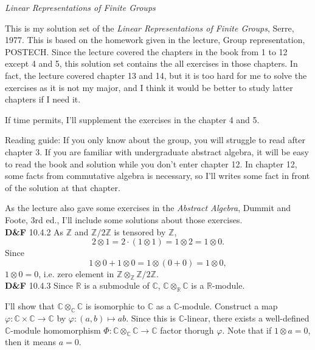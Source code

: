 \documentclass[a4paper, 12pt]{article}
\theoremstyle{Mydefinition}
\theoremstyle{Mytheorem}
\begin{document}
\thispagestyle{myfirstpage}
\begin{center}
	\Large{\textit{Linear Representations of Finite Groups}}
\end{center}

This is my solution set of the \textit{Linear Representations of Finite Groups}, Serre, 1977. This is based on the homework given in the lecture, Group representation, POSTECH. Since the lecture covered the chapters in the book from 1 to 12 except 4 and 5, this solution set contains the all exercises in those chapters. In fact, the lecture covered chapter 13 and 14, but it is too hard for me to solve the exercises as it is not my major, and I think it would be better to study latter chapters if I need it.

If time permits, I'll supplement the exercises in the chapter 4 and 5.

Reading guide: If you only know about the group, you will struggle to read after chapter 3. If you are familiar with undergraduate abstract algebra, it will be easy to read the book and solution while you don't enter chapter 12. In chapter 12, some facts from commutative algebra is necessary, so I'll writes some fact in front of the solution at that chapter.

As the lecture also gave some exercises in the \textit{Abstract Algebra}, Dummit and Foote, 3rd ed., I'll include some solutions about those exercises.\\

\noindent \textbf{D\&F} 10.4.2
As $\mathbb{Z}$ and $\mathbb{Z}/2\mathbb{Z}$ is tensored by $\mathbb{Z}$,
\begin{equation}
    2\otimes 1 = 2\cdot (1\otimes 1) = 1 \otimes 2 = 1 \otimes 0.
\end{equation}
Since
\begin{equation}
    1 \otimes 0 + 1 \otimes 0 = 1\otimes (0+0) = 1\otimes 0,
\end{equation}
$1\otimes 0 = 0$, i.e. zero element in $\mathbb{Z}\otimes_\mathbb{Z} \mathbb{Z}/2\mathbb{Z}$.\\

\noindent \textbf{D\&F} 10.4.3
Since $\mathbb{R}$ is a submodule of $\mathbb{C}$, $\mathbb{C}\otimes_\mathbb{R}\mathbb{C}$ is a $\mathbb{R}$-module.

I'll show that $\mathbb{C}\otimes_\mathbb{C}\mathbb{C}$ is isomorphic to $\mathbb{C}$ as a $\mathbb{C}$-module. Construct a map $\varphi:\mathbb{C}\times \mathbb{C}\rightarrow \mathbb{C}$ by $\varphi:(a, b) \mapsto ab$. Since this is $\mathbb{C}$-linear, there exists a well-defined $\mathbb{C}$-module homomorphism $\Phi:\mathbb{C}\otimes_\mathbb{C} \mathbb{C}\rightarrow \mathbb{C}$ factor thorugh $\varphi$. Note that if $1\otimes a = 0$, then it means $a=0$.
\end{document}
